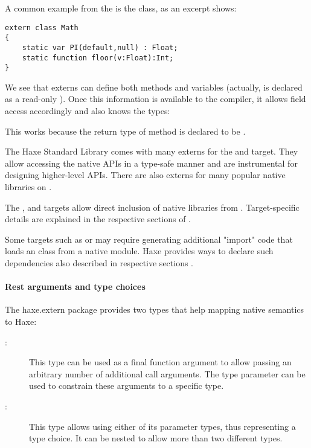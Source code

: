 A common example from the  is the  class, as an excerpt shows:

\begin{lstlisting}
extern class Math
{
	static var PI(default,null) : Float;
	static function floor(v:Float):Int;
}
\end{lstlisting}

We see that externs can define both methods and variables (actually,  is declared as a read-only ). Once this information is available to the compiler, it allows field access accordingly and also knows the types:


This works because the return type of method  is declared to be .

The Haxe Standard Library comes with many externs for the  and  target. They allow accessing the native APIs in a type-safe manner and are instrumental for designing higher-level APIs. There are also externs for many popular native libraries on .

The ,  and  targets allow direct inclusion of native libraries from . Target-specific details are explained in the respective sections of .

Some targets such as  or  may require generating additional "import" code that loads an  class from a native module. Haxe provides ways to declare such dependencies also described in respective sections .

\paragraph{Rest arguments and type choices}

The haxe.extern package provides two types that help mapping native semantics to Haxe:

\begin{description}
	\item[:] This type can be used as a final function argument to allow passing an arbitrary number of additional call arguments. The type parameter can be used to constrain these arguments to a specific type.
	\item[:] This type allows using either of its parameter types, thus representing a type choice. It can be nested to allow more than two different types.
\end{description}


